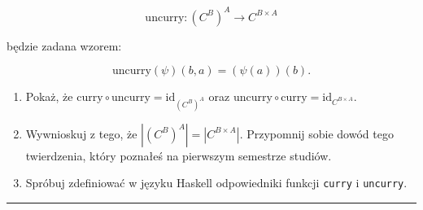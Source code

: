 \documentclass[11pt,a4paper]{article}
\begin{document}
\[
\text{uncurry} : (C^B)^A \to C^{B \times A}
\]

będzie zadana wzorem:

\[
\text{uncurry}(\psi)(b, a) = (\psi(a))(b).
\]

\begin{enumerate}
    \item Pokaż, że \( \text{curry} \circ \text{uncurry} = \text{id}_{(C^B)^A} \) oraz \( \text{uncurry} \circ \text{curry} = \text{id}_{C^{B \times A}} \).

    \item Wywnioskuj z tego, że \( |(C^B)^A| = |C^{B \times A}| \). Przypomnij sobie dowód tego twierdzenia, który poznałeś na pierwszym semestrze studiów.

    \item Spróbuj zdefiniować w języku Haskell odpowiedniki funkcji \texttt{curry} i \texttt{uncurry}.
\end{enumerate}

\bigskip
\hrule
\bigskip
\end{document}
